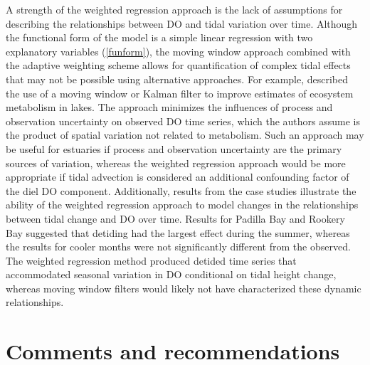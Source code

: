 \documentclass[letterpaper,12pt,oneside]{article}\usepackage[]{graphicx}\usepackage[]{color}
\begin{document}
A strength of the weighted regression approach is the lack of assumptions for describing the relationships between \ac{DO} and tidal variation over time.  Although the functional form of the model is a simple linear regression with two explanatory variables (\cref{funform}), the moving window approach combined with the adaptive weighting scheme allows for quantification of complex tidal effects that may not be possible using alternative approaches.  For example, \citet{Batt12} described the use of a moving window or Kalman filter to improve estimates of ecosystem metabolism in lakes.  The approach minimizes the influences of process and observation uncertainty on observed \ac{DO} time series, which the authors assume is the product of spatial variation not related to metabolism.  Such an approach may be useful for estuaries if process and observation uncertainty are the primary sources of variation, whereas the weighted regression approach would be more appropriate if tidal advection is considered an additional confounding factor of the diel \ac{DO} component.  Additionally, results from the case studies illustrate the ability of the weighted regression approach to model changes in the relationships between tidal change and \ac{DO} over time.  Results for Padilla Bay and Rookery Bay suggested that detiding had the largest effect during the summer, whereas the results for cooler months were not significantly different from the observed.  The weighted regression method produced detided time series that accommodated seasonal variation in \ac{DO} conditional on tidal height change, whereas moving window filters would likely not have characterized these dynamic relationships.

\section{Comments and recommendations}
\end{document}
